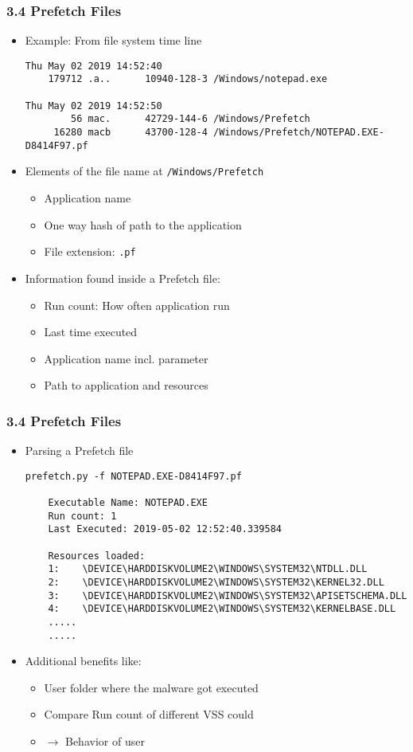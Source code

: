 \begin{frame}[fragile]
  \frametitle{3.4 Prefetch Files}
    \begin{itemize}
        \item Example: From file system time line
  \begin{lstlisting}[basicstyle=\tiny]
Thu May 02 2019 14:52:40
    179712 .a..      10940-128-3 /Windows/notepad.exe

Thu May 02 2019 14:52:50
        56 mac.      42729-144-6 /Windows/Prefetch
     16280 macb      43700-128-4 /Windows/Prefetch/NOTEPAD.EXE-D8414F97.pf
  \end{lstlisting}
        \item Elements of the file name at \texttt{/Windows/Prefetch}
        \begin{itemize}
            \item Application name
            \item One way hash of path to the application
	    \item File extension: \texttt{.pf}
        \end{itemize}
        \item Information found inside a Prefetch file:
        \begin{itemize}
            \item Run count: How often application run
            \item Last time executed
            \item Application name incl. parameter
            \item Path to application and resources
        \end{itemize}
    \end{itemize}
\end{frame}


\begin{frame}[fragile]
  \frametitle{3.4 Prefetch Files}
    \begin{itemize}
        \item Parsing a Prefetch file
  \begin{lstlisting}[basicstyle=\tiny]
prefetch.py -f NOTEPAD.EXE-D8414F97.pf

	Executable Name: NOTEPAD.EXE
	Run count: 1
	Last Executed: 2019-05-02 12:52:40.339584

	Resources loaded:
	1:    \DEVICE\HARDDISKVOLUME2\WINDOWS\SYSTEM32\NTDLL.DLL
	2:    \DEVICE\HARDDISKVOLUME2\WINDOWS\SYSTEM32\KERNEL32.DLL
	3:    \DEVICE\HARDDISKVOLUME2\WINDOWS\SYSTEM32\APISETSCHEMA.DLL
	4:    \DEVICE\HARDDISKVOLUME2\WINDOWS\SYSTEM32\KERNELBASE.DLL
	.....
	.....
  \end{lstlisting}
        \item Additional benefits like:
        \begin{itemize}
            \item User folder where the malware got executed
            \item Compare Run count of different VSS could
	    \item[] $\to$ Behavior of user
        \end{itemize}
    \end{itemize}
\end{frame}


